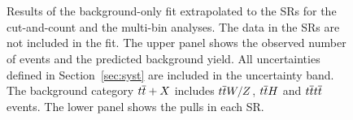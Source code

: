 \begin{figure}[htbp]
	\centering
	\\
	\\
	\caption{Results of the background-only fit extrapolated to the SRs for 
	the cut-and-count and  the multi-bin analyses. The data in the  SRs are 
	not included in the fit.  The upper panel shows the observed number of events and the predicted background 
	yield. All uncertainties  defined in Section~\ref{sec:syst} are included in the uncertainty band. The background 
	category $t\overline{t}+X$ includes $t\overline{t} W/Z$, $t\overline{t} H$ and $t\overline{t} t\overline{t}$ events. The lower panel shows the 
	pulls in each SR.} 
	\label{fig:pullSR}
\end{figure}

